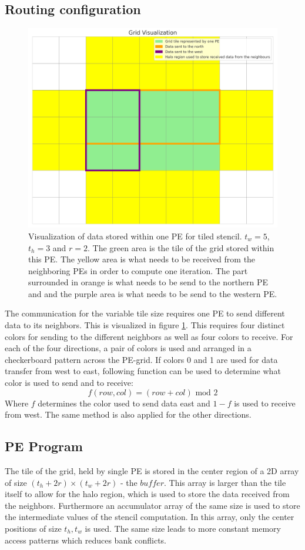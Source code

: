 \documentclass{article}
\newcommand{\m}{\text{ mod }}
\begin{document}
\subsection{Routing configuration}
\begin{figure}
    \centering
    \includegraphics[width=0.5\linewidth]{plots/grid_visualization.png}
    \caption{Visualization of data stored within one PE for tiled stencil. $t_w=5$, $t_h=3$ and $r=2$. The green area is the tile of the grid stored within this PE. The yellow area is what needs to be received from the neighboring PEs in order to compute one iteration. The part surrounded in orange is what needs to be send to the northern PE and and the purple area is what needs to be send to the western PE.}
    \label{fig:grid_visualization}
\end{figure}
The communication for the variable tile size requires one PE to send different data to its neighbors. This is visualized in figure \ref{fig:grid_visualization}. This requires four distinct colors for sending to the different neighbors as well as four colors to receive. For each of the four directions, a pair of colors is used and arranged in a checkerboard pattern across the PE-grid.
If colors 0 and 1 are used for data transfer from west to east, following function can be used to determine what color is used to send and to receive:
\begin{equation}
    \label{eq:tiled_coloring_function}
    f(row, col)=(row+col)\m2
\end{equation}
Where $f$ determines the color used to send data east and $1-f$ is used to receive from west. The same method is also applied for the other directions.
\subsection{PE Program}
The tile of the grid, held by single PE is stored in the center region of a 2D array of size $(t_h+2r)\times (t_w+2r)$ - the $buffer$. This array is larger than the tile itself to allow for the halo region, which is used to store the data received from the neighbors. Furthermore an accumulator array of the same size is used to store the intermediate values of the stencil computation. In this array, only the center positions of size $t_h, t_w$ is used. The same size leads to more constant memory access patterns which reduces bank conflicts.
\end{document}
